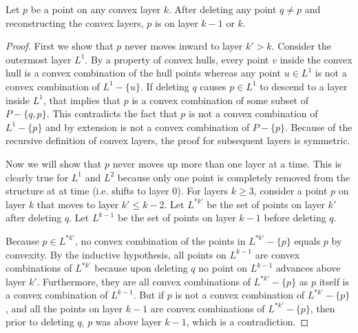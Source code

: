 \documentclass{cccg24}
\newenvironment{customlemma}[1]
  {\renewcommand\theinnercustomthm{#1}\innercustomthm}
  {\endinnercustomthm}
\begin{document}
\begin{customlemma}{\ref{lem:combined}(3)}
    Let $p$ be a point on any convex layer $k$. After deleting any point $q \neq p$ and reconstructing the convex layers, $p$ is on layer $k-1$ or $k$.
\end{customlemma}
\begin{proof}
    First we show that $p$ never moves inward to layer $k' > k$. Consider the outermost layer $L^1$. By a property of convex hulls, every point $v$ inside the convex hull is a convex combination of the hull points whereas any point $u \in L^1$ is not a convex combination of $L^1 - \{u\}$. If deleting $q$ causes $p \in L^1$ to descend to a layer inside $L^1$, that implies that $p$ is a convex combination of some subset of $P - \{q, p\}$. This contradicts the fact that $p$ is not a convex combination of $L^1 - \{p\}$ and by extension is not a convex combination of $P - \{p\}$. Because of the recursive definition of convex layers, the proof for subsequent layers is symmetric. 

    Now we will show that $p$ never moves up more than one layer at a time. This is clearly true for $L^1$ and $L^2$ because only one point is completely removed from the structure at at time (i.e. shifts to layer 0). For layers $k \geq 3$, consider a point $p$ on layer $k$ that moves to layer $k' \leq k-2$. Let $L^{*k'}$ be the set of points on layer $k'$ after deleting $q$. Let $L^{k-1}$ be the set of points on layer $k-1$ before deleting $q$.
    
    Because $p \in L^{*k'}$, no convex combination of the points in $L^{*k'} - \{p\}$ equals $p$ by convexity. By the inductive hypothesis, all points on $L^{k-1}$ are convex combinations of $L^{*k'}$ because upon deleting $q$ no point on $L^{k-1}$ advances above layer $k'$. Furthermore, they are all convex combinations of $L^{*k'} - \{p\}$ as $p$ itself is a convex combination of $L^{k-1}$. But if $p$ is not a convex combination of $L^{*k'} - \{p\}$, and all the points on layer $k-1$ are convex combinations of $L^{*k'} - \{p\}$, then prior to deleting $q$, $p$ was above layer $k-1$, which is a contradiction. 
\end{proof}
\end{document}
